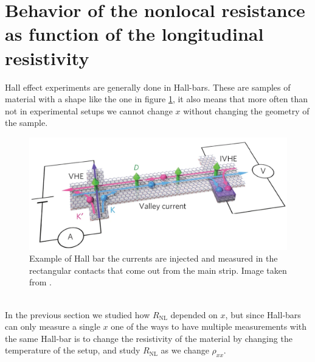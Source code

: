 


\section{Behavior of the nonlocal resistance as function of the longitudinal resistivity}
Hall effect experiments are generally done in Hall-bars. These are samples of material with a shape like the one in figure \ref{fig:hall-bar}, it also means that more often than not in experimental setups we cannot change $x$ without changing the geometry of the sample.
\begin{figure}[h!]
    \centering
    \includegraphics[width=\linewidth]{Immagini/rnl/hallbarbrutta.png}
    \caption{Example of Hall bar the currents are injected and measured in the rectangular contacts that come out from the main strip. Image taken from \cite{shimazaki2015generation}.}
    \label{fig:hall-bar}
\end{figure}\\
In the previous section we studied how $R_{\textrm{NL}}$ depended on $x$, but since Hall-bars can only measure a single $x$ one of the ways to have multiple measurements with the same Hall-bar is to change the resistivity of the material by changing the temperature of the setup, and study $R_{\textrm{NL}}$ as we change $\rho_{xx}$.


